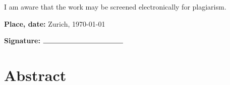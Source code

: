\documentclass[a4paper,11pt,titlepage]{article}
\begin{document}
I am aware that the work may be screened electronically for plagiarism. \\
\vspace{0.5cm}

\begin{center}
    \textbf{Place, date:}      Zurich, \today\\
\end{center}
\vspace{0.01cm}
\begin{center}
\textbf{Signature: }$\rule{4cm}{0.15mm}$\\
\end{center}


%




\section{Abstract}


\newpage
\tableofcontents
\thispagestyle{empty}

\newpage


\end{document}
